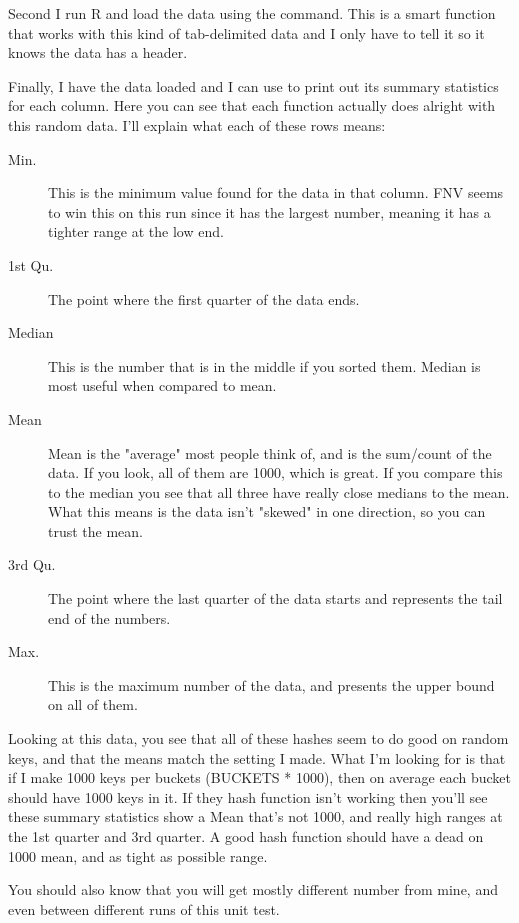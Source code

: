 Second I run R and load the data using the  command.  This
is a smart function that works with this kind of tab-delimited data and
I only have to tell it  so it knows the data has a header.

Finally, I have the data loaded and I can use  to print out
its summary statistics for each column.  Here you can see that each function
actually does alright with this random data.  I'll explain what each
of these rows means:

\begin{description}
\item[Min.] This is the minimum value found for the data in that column.
    FNV seems to win this on this run since it has the largest number, meaning
    it has a tighter range at the low end.
\item[1st Qu.] The point where the first quarter of the data ends.
\item[Median] This is the number that is in the middle if you sorted them.
    Median is most useful when compared to mean.
\item[Mean] Mean is the "average" most people think of, and is the sum/count
    of the data.  If you look, all of them are 1000, which is great.
    If you compare this to the median you see that all three have really
    close medians to the mean.  What this means is the data isn't "skewed"
    in one direction, so you can trust the mean.
\item[3rd Qu.] The point where the last quarter of the data starts and represents
    the tail end of the numbers.
\item[Max.] This is the maximum number of the data, and presents the upper
    bound on all of them.
\end{description}

Looking at this data, you see that all of these hashes seem to do good on random
keys, and that the means match the  setting I made.  What I'm
looking for is that if I make 1000 keys per buckets (BUCKETS * 1000), then on
average each bucket should have 1000 keys in it.  If they hash function isn't
working then you'll see these summary statistics show a Mean that's not 1000,
and really high ranges at the 1st quarter and 3rd quarter.  A good hash function
should have a dead on 1000 mean, and as tight as possible range.

You should also know that you will get mostly different number from mine, and
even between different runs of this unit test.

